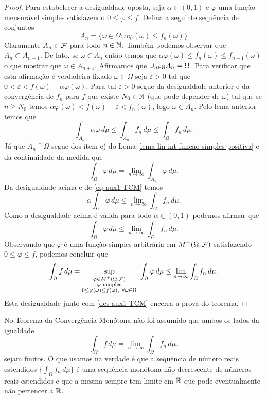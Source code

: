 \begin{proof}
Para estabelecer a desigualdade oposta, seja 
$\alpha\in (0,1)$ e $\varphi$ uma função mensurável
simples satisfazendo $0\leq \varphi\leq f$.
Defina a seguinte sequência de conjuntos 
\[
	A_n = \{\omega\in\Omega: 
			\alpha \varphi(\omega)\leq f_n(\omega)
		\}
\]
Claramente $A_n\in \mathcal{F}$ para todo $n\in\mathbb{N}$. Também 
podemos observar que $A_n\subset A_{n+1}$.
De fato, se $\omega\in A_n$ então 
temos que 
$\alpha \varphi(\omega)\leq f_n(\omega)\leq f_{n+1}(\omega)$
o que mostrar que $\omega\in A_{n+1}$.
Afirmamos que $\cup_{n\in\mathbb{N}} A_n = \Omega$.
Para verificar que esta afirmação é verdadeira 
fixado $\omega\in\Omega$ seja 
$\varepsilon>0$ tal que 
$0<\varepsilon<f(\omega)-\alpha\varphi(\omega)$. 
Para tal $\varepsilon>0$
segue da desigualdade anterior e da convergência de $f_n$
para $f$ que existe $N_0\in\mathbb{N}$
(que pode depender de $\omega$) tal que   
se $n\geq N_0$ temos 
$\alpha\varphi(\omega)< f(\omega)-\varepsilon < f_n(\omega)$, 
logo $\omega\in A_n$. Pelo lema anterior temos que 
	\begin{equation}\label{eq-aux1-TCM}
	\int_{A_n} \alpha\varphi\, d\mu
	\leq 
	\int_{A_n} f_n\, d\mu
	\leq
	\int_{\Omega} f_n\, d\mu.
	\end{equation}
Já que $A_n\uparrow \Omega$ segue dos item c) do 
Lema \ref{lema-lin-int-funcao-simples-positiva} e 
da continuidade da medida que 
	\[
		\int_{\Omega} \varphi\, d\mu
		=
		\lim_{n\to\infty} \int_{A_n} \varphi\, d\mu.
	\]
Da desigualdade acima e de \eqref{eq-aux1-TCM} temos 
	\[
		\alpha\int_{\Omega} \varphi\, d\mu
		\leq
		\lim_{n\to\infty} \int_{\Omega} f_n\, d\mu.
	\]
Como a desigualdade acima é válida para todo $\alpha\in(0,1)$
podemos afirmar que 
	\[
		\int_{\Omega} \varphi\, d\mu
		\leq
		\lim_{n\to\infty} \int_{\Omega} f_n\, d\mu.
	\]
Observando que $\varphi$ é uma função simples 
arbitrária em $M^{+}(\Omega,\mathcal{F})$ satisfazendo 
$0\leq \varphi\leq f$, podemos concluir que
\[
		\int_{\Omega} f\, d\mu
		=
		\sup_{ \substack{ 	\varphi \in M^{+}(\Omega,\F)
							\\
							\varphi\ \text{simples}
							\\ 
							0\leq\varphi(\omega)\leq f(\omega)
							,\ \forall \omega\in\Omega }  } 
		\ 
		\int_{\Omega} \varphi \, d\mu
		\leq
		\lim_{n\to\infty} \int_{\Omega} f_n\, d\mu.
\]
Esta desigualdade junto com \eqref{des-aux1-TCM}
encerra a prova do teorema.
\end{proof}


\begin{observacao}
No Teorema da Convergência Monótona não foi 
assumido que ambos os lados da igualdade 
\[
		\int_{\Omega} f\, d\mu
		=
		\lim_{n\to\infty} \int_{\Omega} f_n\, d\mu.
\]
sejam finitos. O que usamos na verdade é que a 
sequência de número reais estendidos 
$\{\int_{\Omega} f_n\, d\mu\}$ é uma sequência 
monótona não-decrescente de números reais estendidos
e que a mesma sempre tem limite em $\overline{\mathbb{R}}$ 
que pode eventualmente não pertencer a $\mathbb{R}$.
\end{observacao}





